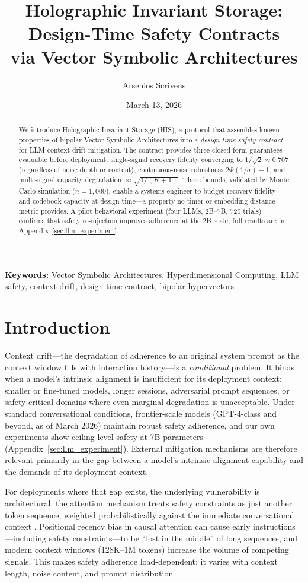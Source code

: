 \documentclass[a4paper,11pt]{article}
\title{\textbf{Holographic Invariant Storage: Design-Time Safety Contracts\\via Vector Symbolic Architectures}}
\author{Arsenios Scrivens}
\affil{Independent Researcher}
\date{March 13, 2026}
\begin{document}
\maketitle

\begin{abstract}
We introduce Holographic Invariant Storage (HIS), a protocol that assembles known properties of bipolar Vector Symbolic Architectures into a \textit{design-time safety contract} for LLM context-drift mitigation. The contract provides three closed-form guarantees evaluable before deployment: single-signal recovery fidelity converging to $1/\sqrt{2} \approx 0.707$ (regardless of noise depth or content), continuous-noise robustness $2\Phi(1/\sigma) - 1$, and multi-signal capacity degradation $\approx\!\sqrt{1/(K{+}1)}$. These bounds, validated by Monte Carlo simulation ($n = 1{,}000$), enable a systems engineer to budget recovery fidelity and codebook capacity at design time---a property no timer or embedding-distance metric provides. A pilot behavioral experiment (four LLMs, 2B--7B, 720 trials) confirms that safety re-injection improves adherence at the 2B scale; full results are in Appendix~\ref{sec:llm_experiment}.
\end{abstract}

\textbf{Keywords:} Vector Symbolic Architectures, Hyperdimensional Computing, LLM safety, context drift, design-time contract, bipolar hypervectors

\section{Introduction}

Context drift---the degradation of adherence to an original system prompt as the context window fills with interaction history---is a \textit{conditional} problem. It binds when a model's intrinsic alignment is insufficient for its deployment context: smaller or fine-tuned models, longer sessions, adversarial prompt sequences, or safety-critical domains where even marginal degradation is unacceptable. Under standard conversational conditions, frontier-scale models (GPT-4-class and beyond, as of March 2026) maintain robust safety adherence, and our own experiments show ceiling-level safety at 7B parameters (Appendix~\ref{sec:llm_experiment}). External mitigation mechanisms are therefore relevant primarily in the gap between a model's intrinsic alignment capability and the demands of its deployment context.

For deployments where that gap exists, the underlying vulnerability is architectural: the attention mechanism treats safety constraints as just another token sequence, weighted probabilistically against the immediate conversational context \cite{vaswani2017, liu2024}. Positional recency bias in causal attention can cause early instructions---including safety constraints---to be ``lost in the middle'' of long sequences, and modern context windows (128K--1M tokens) increase the volume of competing signals. This makes safety adherence load-dependent: it varies with context length, noise content, and prompt distribution \cite{wei2023, perez2022}.
\end{document}

